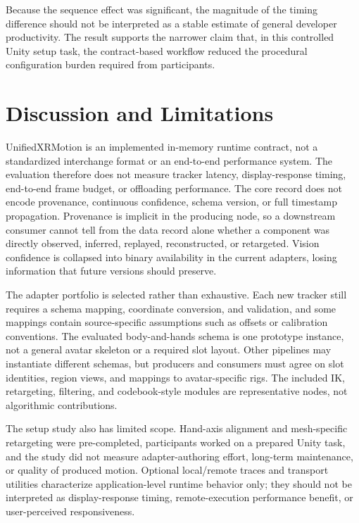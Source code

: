 \documentclass[runningheads]{llncs}
\begin{document}
Because the sequence effect was significant, the magnitude of the timing difference should not be interpreted as a stable estimate of general developer productivity. The result supports the narrower claim that, in this controlled Unity setup task, the contract-based workflow reduced the procedural configuration burden required from participants.

\section{Discussion and Limitations}\label{sec:discussion-limitations}
UnifiedXRMotion is an implemented in-memory runtime contract, not a standardized interchange format or an end-to-end performance system. The evaluation therefore does not measure tracker latency, display-response timing, end-to-end frame budget, or offloading performance. The core record does not encode provenance, continuous confidence, schema version, or full timestamp propagation. Provenance is implicit in the producing node, so a downstream consumer cannot tell from the data record alone whether a component was directly observed, inferred, replayed, reconstructed, or retargeted. Vision confidence is collapsed into binary availability in the current adapters, losing information that future versions should preserve.

The adapter portfolio is selected rather than exhaustive. Each new tracker still requires a schema mapping, coordinate conversion, and validation, and some mappings contain source-specific assumptions such as offsets or calibration conventions. The evaluated body-and-hands schema is one prototype instance, not a general avatar skeleton or a required slot layout. Other pipelines may instantiate different schemas, but producers and consumers must agree on slot identities, region views, and mappings to avatar-specific rigs. The included IK, retargeting, filtering, and codebook-style modules are representative nodes, not algorithmic contributions.

The setup study also has limited scope. Hand-axis alignment and mesh-specific retargeting were pre-completed, participants worked on a prepared Unity task, and the study did not measure adapter-authoring effort, long-term maintenance, or quality of produced motion. Optional local/remote traces and transport utilities characterize application-level runtime behavior only; they should not be interpreted as display-response timing, remote-execution performance benefit, or user-perceived responsiveness.
\end{document}
